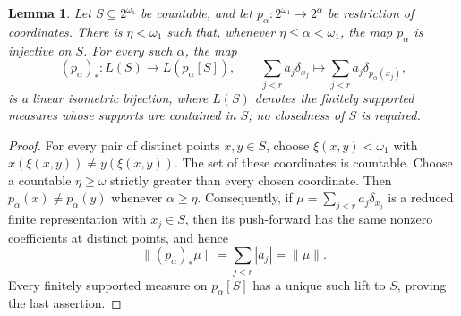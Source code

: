 \documentclass[10pt,a4paper]{amsart}
\newtheorem{lemma}[theorem]{Lemma}
\numberwithin{equation}{section}
\begin{document}
\begin{lemma}\label{lem:support-projection}
Let $S\subseteq2^{\omega_1}$ be countable, and let
$p_\alpha:2^{\omega_1}\to2^\alpha$ be restriction of coordinates.
There is $\eta<\omega_1$ such that, whenever
$\eta\leqslant\alpha<\omega_1$, the map $p_\alpha$ is injective on $S$.
For every such $\alpha$, the map
\[
 (p_\alpha)_*:L(S)\longrightarrow L(p_\alpha[S]),
 \qquad \sum_{j<r}a_j\delta_{x_j}
       \longmapsto\sum_{j<r}a_j\delta_{p_\alpha(x_j)},
\]
is a linear isometric bijection, where $L(S)$ denotes the finitely
supported measures whose supports are contained in $S$; no closedness
of $S$ is required.
\end{lemma}

\begin{proof}
For every pair of distinct points $x,y\in S$, choose
$\xi(x,y)<\omega_1$ with $x(\xi(x,y))\neq y(\xi(x,y))$.
The set of these coordinates is countable.  Choose a countable
$\eta\geqslant\omega$ strictly greater than every chosen coordinate.
Then $p_\alpha(x)\neq p_\alpha(y)$ whenever $\alpha\geqslant\eta$.
Consequently, if $\mu=\sum_{j<r}a_j\delta_{x_j}$ is a reduced finite
representation with $x_j\in S$, then its push-forward has the same
nonzero coefficients at distinct points, and hence
\[
 \|(p_\alpha)_*\mu\|=\sum_{j<r}|a_j|=\|\mu\|.
\]
Every finitely supported measure on $p_\alpha[S]$ has a unique such
lift to $S$, proving the last assertion.
\end{proof}
\end{document}

